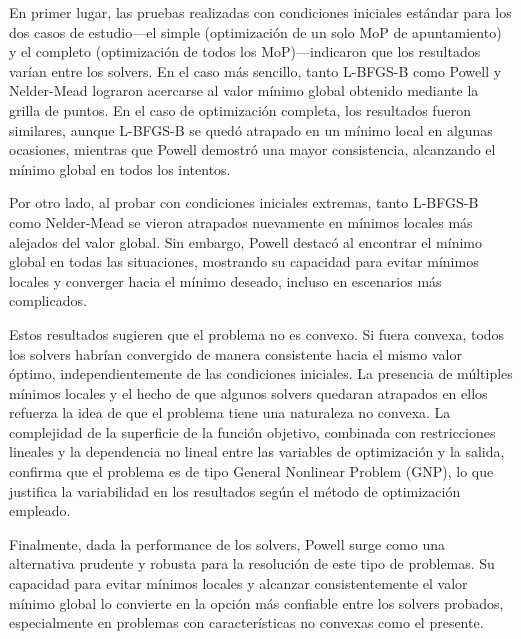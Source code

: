 En primer lugar, las pruebas realizadas con condiciones iniciales estándar para los dos casos de estudio—el simple (optimización de un solo MoP de apuntamiento) y el completo (optimización de todos los MoP)—indicaron que los resultados varían entre los solvers. En el caso más sencillo, tanto L-BFGS-B como Powell y Nelder-Mead lograron acercarse al valor mínimo global obtenido mediante la grilla de puntos. En el caso de optimización completa, los resultados fueron similares, aunque L-BFGS-B se quedó atrapado en un mínimo local en algunas ocasiones, mientras que Powell demostró una mayor consistencia, alcanzando el mínimo global en todos los intentos.

Por otro lado, al probar con condiciones iniciales extremas, tanto L-BFGS-B como Nelder-Mead se vieron atrapados nuevamente en mínimos locales más alejados del valor global. Sin embargo, Powell destacó al encontrar el mínimo global en todas las situaciones, mostrando su capacidad para evitar mínimos locales y converger hacia el mínimo deseado, incluso en escenarios más complicados.

Estos resultados sugieren que el problema no es convexo. Si fuera convexa, todos los solvers habrían convergido de manera consistente hacia el mismo valor óptimo, independientemente de las condiciones iniciales. La presencia de múltiples mínimos locales y el hecho de que algunos solvers quedaran atrapados en ellos refuerza la idea de que el problema tiene una naturaleza no convexa. La complejidad de la superficie de la función objetivo, combinada con restricciones lineales y la dependencia no lineal entre las variables de optimización y la salida, confirma que el problema es de tipo General Nonlinear Problem (GNP), lo que justifica la variabilidad en los resultados según el método de optimización empleado.

Finalmente, dada la performance de los solvers, Powell surge como una alternativa prudente y robusta para la resolución de este tipo de problemas. Su capacidad para evitar mínimos locales y alcanzar consistentemente el valor mínimo global lo convierte en la opción más confiable entre los solvers probados, especialmente en problemas con características no convexas como el presente.